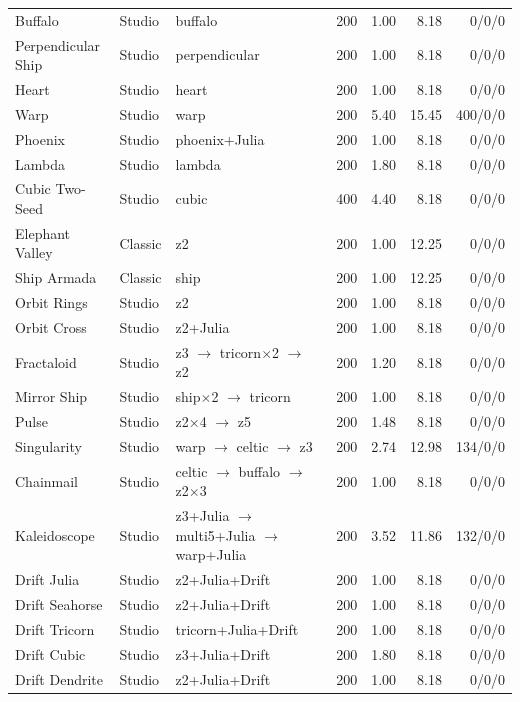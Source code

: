 \documentclass[11pt,a4paper]{article}
\numberwithin{equation}{section}
\newlength{\TW}
\begin{document}
\begin{longtable}{@{}L{0.2\TW}L{0.085\TW}L{0.232\TW}R{0.09\TW}R{0.139\TW}R{0.132\TW}R{0.122\TW}@{}}
Buffalo & Studio & buffalo & 200 & 1.00 & 8.18 & \mbox{0/0/0} \\
Perpendicular Ship & Studio & perpendicular & 200 & 1.00 & 8.18 & \mbox{0/0/0} \\
Heart & Studio & heart & 200 & 1.00 & 8.18 & \mbox{0/0/0} \\
Warp & Studio & warp & 200 & 5.40 & 15.45 & \mbox{400/0/0} \\
Phoenix & Studio & phoenix+Julia & 200 & 1.00 & 8.18 & \mbox{0/0/0} \\
Lambda & Studio & lambda & 200 & 1.80 & 8.18 & \mbox{0/0/0} \\
Cubic Two-Seed & Studio & cubic & 400 & 4.40 & 8.18 & \mbox{0/0/0} \\
Elephant Valley & Classic & z2 & 200 & 1.00 & 12.25 & \mbox{0/0/0} \\
Ship Armada & Classic & ship & 200 & 1.00 & 12.25 & \mbox{0/0/0} \\
Orbit Rings & Studio & z2 & 200 & 1.00 & 8.18 & \mbox{0/0/0} \\
Orbit Cross & Studio & z2+Julia & 200 & 1.00 & 8.18 & \mbox{0/0/0} \\
Fractaloid & Studio & z3 \(\to\) tricorn\(\times\)2 \(\to\) z2 & 200 & 1.20 & 8.18 & \mbox{0/0/0} \\
Mirror Ship & Studio & ship\(\times\)2 \(\to\) tricorn & 200 & 1.00 & 8.18 & \mbox{0/0/0} \\
Pulse & Studio & z2\(\times\)4 \(\to\) z5 & 200 & 1.48 & 8.18 & \mbox{0/0/0} \\
Singularity & Studio & warp \(\to\) celtic \(\to\) z3 & 200 & 2.74 & 12.98 & \mbox{134/0/0} \\
Chainmail & Studio & celtic \(\to\) buffalo \(\to\) z2\(\times\)3 & 200 & 1.00 & 8.18 & \mbox{0/0/0} \\
Kaleidoscope & Studio & z3+Julia \(\to\) multi5+Julia \(\to\) warp+Julia & 200 & 3.52 & 11.86 & \mbox{132/0/0} \\
Drift Julia & Studio & z2+Julia+Drift & 200 & 1.00 & 8.18 & \mbox{0/0/0} \\
Drift Seahorse & Studio & z2+Julia+Drift & 200 & 1.00 & 8.18 & \mbox{0/0/0} \\
Drift Tricorn & Studio & tricorn+Julia+Drift & 200 & 1.00 & 8.18 & \mbox{0/0/0} \\
Drift Cubic & Studio & z3+Julia+Drift & 200 & 1.80 & 8.18 & \mbox{0/0/0} \\
Drift Dendrite & Studio & z2+Julia+Drift & 200 & 1.00 & 8.18 & \mbox{0/0/0} \\

\end{longtable}
\end{document}
